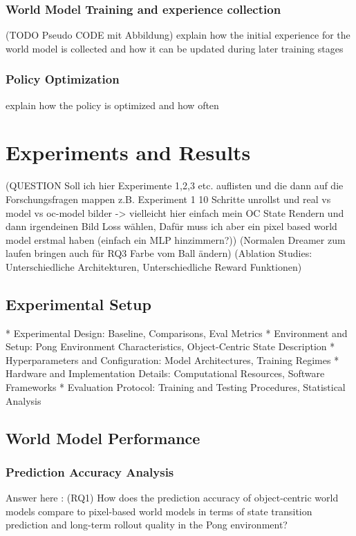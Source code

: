 \documentclass[
	english,
	ruledheaders=section,
	class=report,
	thesis={type=master},
	accentcolor=9c,
	custommargins=true,
	marginpar=false,
	parskip=half-,
	fontsize=11pt,
]{tudapub}
\begin{document}
\subsection{World Model Training and experience collection}
\label{subsec:world_model_training}
(TODO Pseudo CODE mit Abbildung)
explain how the initial experience for the world model is collected and how it can be updated during later training stages

\subsection{Policy Optimization}
\label{subsec:policy_optimization}
explain how the policy is optimized and how often

\chapter{Experiments and Results}
\label{chap:experiments}
(QUESTION Soll ich hier Experimente 1,2,3 etc. auflisten und die dann auf die Forschungsfragen mappen
z.B. Experiment 1 10 Schritte unrollst und real vs model vs oc-model bilder -> vielleicht hier einfach
mein OC State Rendern und dann irgendeinen Bild Loss wählen, Dafür muss ich aber ein pixel based world model erstmal haben (einfach ein MLP hinzimmern?))
(Normalen Dreamer zum laufen bringen auch für RQ3 Farbe vom Ball ändern)
(Ablation Studies: Unterschiedliche Architekturen, Unterschiedliche Reward Funktionen)

\section{Experimental Setup}
\label{sec:exp_setup}
* Experimental Design: Baseline, Comparisons, Eval Metrics
* Environment and Setup: Pong Environment Characteristics, Object-Centric State Description
* Hyperparameters and Configuration: Model Architectures, Training Regimes
* Hardware and Implementation Details: Computational Resources, Software Frameworks
* Evaluation Protocol: Training and Testing Procedures, Statistical Analysis

\section{World Model Performance}
\label{sec:world_model_perf}

\subsection{Prediction Accuracy Analysis}
\label{subsec:prediction_accuracy}
Answer here : (RQ1) How does the prediction accuracy of object-centric world models compare to pixel-based world models in terms of state transition prediction and long-term rollout quality in the Pong environment?
\end{document}
